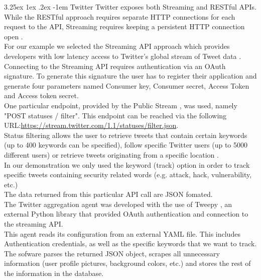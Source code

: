 \documentclass[12pt]{article}
\makeatletter
\renewcommand\paragraph{\@startsection{paragraph}{5}{\z@}%
  {3.25ex \@plus1ex \@minus.2ex}%
  {-1em}%
  {\normalfont\normalsize\bfseries}}
\makeatother
\begin{document}
\paragraph{Twitter}
\hfill \break
Twitter exposes both Streaming and RESTful APIs. While the RESTful approach requires separate HTTP connections for each request to the API, Streaming requires keeping a persistent HTTP connection open \cite{twitteroverview}.
\hfill \break \\
For our example we selected the Streaming API approach which provides developers with low latency access to Twitter's global stream of Tweet data \cite{twitteroverview}.
\hfill \break \\
Connecting to the Streaming API requires authentication via an OAuth signature. To generate this signature the user has to register their application and generate four parameters named Consumer key, Consumer secret, Access Token and Access token secret.
\hfill \break \\
One particular endpoint, provided by the Public Stream \cite{twitterpublic}, was used, namely "POST statuses / filter". This endpoint can be reached via the following URL:\url{https://stream.twitter.com/1.1/statuses/filter.json}.
\hfill \break \\
Status filtering allows the user to retrieve tweets that contain certain keywords (up to 400 keywords can be specified), follow specific Twitter users (up to 5000 different users) or retrieve tweets originating from a specific location \cite{twitterfilter}.
\hfill \break \\
In our demonstration we only used the keyword (track) option in order to track specific tweets containing security related words (e.g. attack, hack, vulnerability, etc.)
\hfill \break \\
The data returned from this particular API call are JSON fomated.
\hfill \break \\
The Twitter aggregation agent was developed with the use of Tweepy \cite{tweepy}, an external Python library that provided OAuth authentication and connection to the streaming API.\\ This agent reads its configuration from an external YAML file. This includes Authentication credentials, as well as the specific keywords that we want to track.
\hfill \break \\
The sofware parses the returned JSON object, scrapes all unnecessary information (user profile pictures, background colors, etc.) and stores the rest of the information in the database.  
\end{document}
